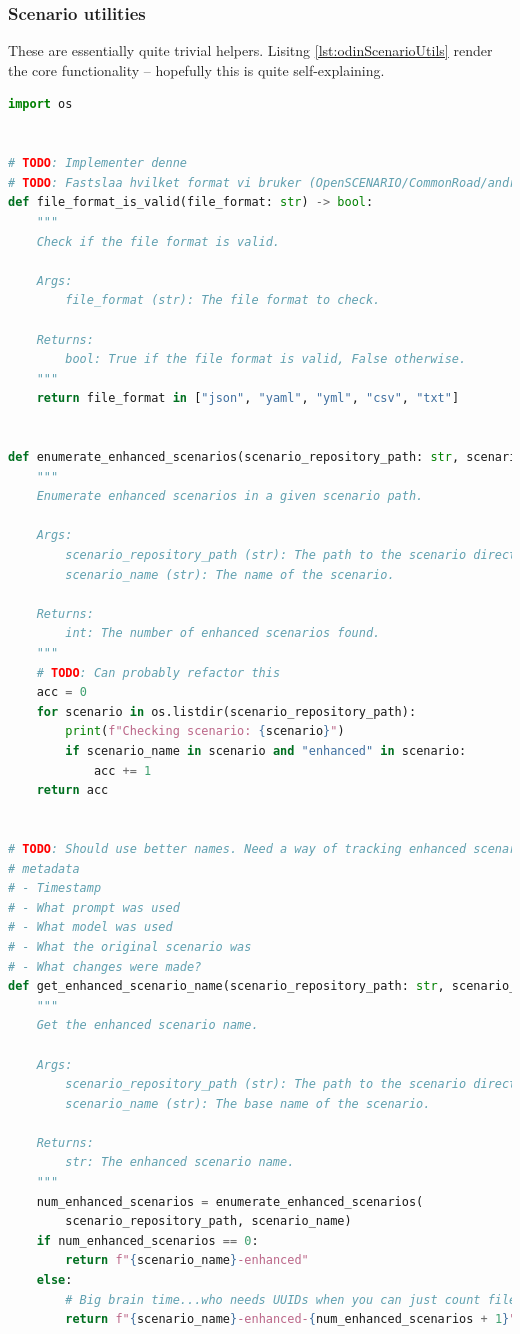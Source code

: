 \subsubsection{Scenario utilities}

These are essentially quite trivial helpers. Lisitng \ref{lst:odinScenarioUtils}
render the core functionality -- hopefully this is quite self-explaining.

\begin{lstlisting}[caption={scenario\_utils.py, The implementation of an various scenaro helper functions for executing prompts.}, label={lst:odinScenarioUtils}, language={Python}]
import os


# TODO: Implementer denne
# TODO: Fastslaa hvilket format vi bruker (OpenSCENARIO/CommonRoad/andre)
def file_format_is_valid(file_format: str) -> bool:
    """
    Check if the file format is valid.

    Args:
        file_format (str): The file format to check.

    Returns:
        bool: True if the file format is valid, False otherwise.
    """
    return file_format in ["json", "yaml", "yml", "csv", "txt"]


def enumerate_enhanced_scenarios(scenario_repository_path: str, scenario_name: str) -> int:
    """
    Enumerate enhanced scenarios in a given scenario path.

    Args:
        scenario_repository_path (str): The path to the scenario directory.
        scenario_name (str): The name of the scenario.

    Returns:
        int: The number of enhanced scenarios found.
    """
    # TODO: Can probably refactor this
    acc = 0
    for scenario in os.listdir(scenario_repository_path):
        print(f"Checking scenario: {scenario}")
        if scenario_name in scenario and "enhanced" in scenario:
            acc += 1
    return acc


# TODO: Should use better names. Need a way of tracking enhanced scenario
# metadata
# - Timestamp
# - What prompt was used
# - What model was used
# - What the original scenario was
# - What changes were made?
def get_enhanced_scenario_name(scenario_repository_path: str, scenario_name: str) -> str:
    """
    Get the enhanced scenario name.

    Args:
        scenario_repository_path (str): The path to the scenario directory.
        scenario_name (str): The base name of the scenario.

    Returns:
        str: The enhanced scenario name.
    """
    num_enhanced_scenarios = enumerate_enhanced_scenarios(
        scenario_repository_path, scenario_name)
    if num_enhanced_scenarios == 0:
        return f"{scenario_name}-enhanced"
    else:
        # Big brain time...who needs UUIDs when you can just count files?
        return f"{scenario_name}-enhanced-{num_enhanced_scenarios + 1}"



\end{lstlisting}
